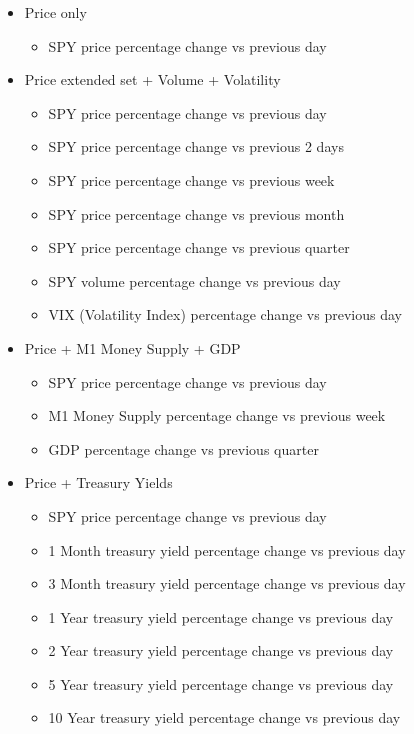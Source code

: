 \begin{itemize}
    \item Price only
    \begin{itemize}
        \item SPY price percentage change vs previous day
    \end{itemize}
    \item Price extended set + Volume + Volatility
    \begin{itemize}
        \item SPY price percentage change vs previous day
        \item SPY price percentage change vs previous 2 days
        \item SPY price percentage change vs previous week
        \item SPY price percentage change vs previous month
        \item SPY price percentage change vs previous quarter
        \item SPY volume percentage change vs previous day
        \item VIX (Volatility Index) percentage change vs previous day
    \end{itemize}
    \item Price + M1 Money Supply + GDP
    \begin{itemize}
        \item SPY price percentage change vs previous day
        \item M1 Money Supply percentage change vs previous week
        \item GDP percentage change vs previous quarter
    \end{itemize}
    \item Price + Treasury Yields
    \begin{itemize}
        \item SPY price percentage change vs previous day
        \item 1 Month treasury yield percentage change vs previous day
        \item 3 Month treasury yield percentage change vs previous day
        \item 1 Year treasury yield percentage change vs previous day
        \item 2 Year treasury yield percentage change vs previous day
        \item 5 Year treasury yield percentage change vs previous day
        \item 10 Year treasury yield percentage change vs previous day

\end{itemize}
\end{itemize}
